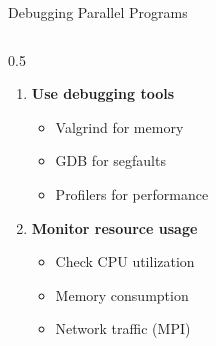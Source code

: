 \documentclass[aspectratio=169,xcolor={dvipsnames}]{beamer}
\begin{document}
\begin{frame}{Debugging Parallel Programs}
\begin{columns}[T]
\begin{column}{0.5\textwidth}
\begin{enumerate}
\begin{itemize}
                \end{itemize}
                \item \textbf{Use debugging tools}
                \begin{itemize}
                    \tiny
                    \item Valgrind for memory
                    \item GDB for segfaults
                    \item Profilers for performance
                \end{itemize}
                \item \textbf{Monitor resource usage}
                \begin{itemize}
                    \tiny
                    \item Check CPU utilization
                    \item Memory consumption
                    \item Network traffic (MPI)
                \end{itemize}
            \end{enumerate}
        \end{column}
    \end{columns}
\end{frame}
\end{document}
